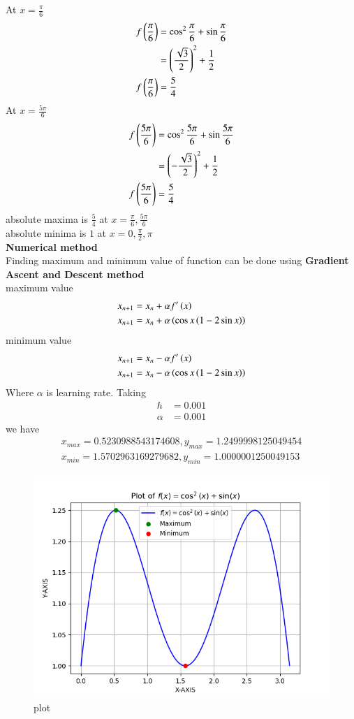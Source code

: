 \documentclass[journal]{IEEEtran}
\begin{document}
At $x=\frac{\pi}{6}$\\
\begin{align}
    f\left(\frac{\pi}{6}\right)&=\cos^2{\frac{\pi}{6}}+\sin{\frac{\pi}{6}}\\
    &=\left(\frac{\sqrt{3}}{2}\right)^2+\frac{1}{2}\\
        f\left(\frac{\pi}{6}\right)&=\frac{5}{4}
\end{align}
At $x=\frac{5\pi}{6}$
\begin{align}
    f\left(\frac{5\pi}{6}\right)&=\cos^2{\frac{5\pi}{6}}+\sin{\frac{5\pi}{6}}\\
    &=\left(-\frac{\sqrt{3}}{2}\right)^2+\frac{1}{2}\\
    f\left(\frac{5\pi}{6}\right)&=\frac{5}{4}
\end{align}
absolute maxima is $\frac{5}{4}$ at $x=\frac{\pi}{6},\frac{5\pi}{6}$\\
absolute minima is $1$ at $x=0,\frac{\pi}{2},\pi$\\
\textbf{Numerical method}  \\

Finding maximum and minimum value of function can be done using \textbf{Gradient Ascent and Descent method} \\
maximum value \\
\begin{align}
    x_{n+1}&=x_n+\alpha f^\prime\left(x\right)\\
    x_{n+1}&=x_{n}+\alpha\left(\cos{x}\left(1-2\sin{x}\right)\right)
\end{align}
minimum value\\
\begin{align}
     x_{n+1}&=x_n-\alpha f^\prime\left(x\right)\\
    x_{n+1}&=x_{n}-\alpha\left(\cos{x}\left(1-2\sin{x}\right)\right)
\end{align}
Where $\alpha$ is learning rate. Taking \\
\begin{align}
    h&=0.001\\
    \alpha&=0.001
\end{align}
we have
\begin{align}
    x_{max}=0.5230988543174608, y_{max}=1.2499998125049454\\
    x_{min}=1.5702963169279682, y_{min}=1.0000001250049153
\end{align}

 \begin{figure}[h!]
    \centering
    \includegraphics[width=1\columnwidth]{figure/fig.png} 
    \caption{plot}
    \label{stemplot}
 \end{figure}
\end{document}
